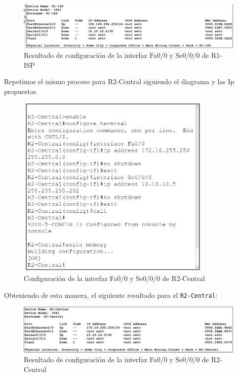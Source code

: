 \documentclass[a4paper,11pt]{article}
\begin{document}
\begin{figure}[h]
    \includegraphics[width=1\textwidth]{images/ip_r1_result.png}
    \caption{Resultado de configuración de la interfaz Fa0/0 y Se0/0/0 de R1-ISP}
\end{figure}

Repetimos el mismo proceso para R2-Central siguiendo el diagrama y las Ip
propuestas

\newpage
\begin{figure}[h]
    \centering
    \includegraphics[width=0.85\textwidth]{images/ip_r2.png}
    \caption{Configuración de la interfaz Fa0/0 y Se0/0/0 de R2-Central}
\end{figure}

Obteniendo de esta manera, el siguiente resultado para el \texttt{R2-Central}:

\begin{figure}[h]

    \includegraphics[width=1\textwidth]{images/ip_r2_result.png}
    \caption{Resultado de configuración de la interfaz Fa0/0 y Se0/0/0 de R2-Central}
\end{figure}
\end{document}
